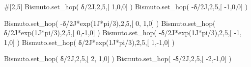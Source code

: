 \documentclass[
  letterpaper,
  DIV=11,
  numbers=noendperiod]{scrreprt}
\newenvironment{Shaded}{\begin{snugshade}}{\end{snugshade}}
\newcommand{\CommentTok}[1]{\textcolor[rgb]{0.37,0.37,0.37}{#1}}
\newcommand{\DecValTok}[1]{\textcolor[rgb]{0.68,0.00,0.00}{#1}}
\newcommand{\NormalTok}[1]{\textcolor[rgb]{0.00,0.23,0.31}{#1}}
\newcommand{\OperatorTok}[1]{\textcolor[rgb]{0.37,0.37,0.37}{#1}}
\newcommand{\OtherTok}[1]{\textcolor[rgb]{0.00,0.23,0.31}{#1}}
\begin{document}
\begin{Shaded}
\begin{Highlighting}[]
\CommentTok{\#[2,5]}
\NormalTok{Bismuto.set\_hop(   δ}\OperatorTok{/}\OtherTok{2J}\NormalTok{,}\DecValTok{2}\NormalTok{,}\DecValTok{5}\NormalTok{,[  }\DecValTok{1}\NormalTok{,}\DecValTok{0}\NormalTok{,}\DecValTok{0}\NormalTok{] ) }
\NormalTok{Bismuto.set\_hop(  }\OperatorTok{{-}}\NormalTok{δ}\OperatorTok{/}\OtherTok{2J}\NormalTok{,}\DecValTok{2}\NormalTok{,}\DecValTok{5}\NormalTok{,[ }\OperatorTok{{-}}\DecValTok{1}\NormalTok{,}\DecValTok{0}\NormalTok{,}\DecValTok{0}\NormalTok{] ) }

\NormalTok{Bismuto.set\_hop(  }\OperatorTok{{-}}\NormalTok{δ}\OperatorTok{/}\OtherTok{2J}\OperatorTok{*}\NormalTok{exp(}\OtherTok{1J}\OperatorTok{*}\NormalTok{pi}\OperatorTok{/}\DecValTok{3}\NormalTok{),}\DecValTok{2}\NormalTok{,}\DecValTok{5}\NormalTok{,[  }\DecValTok{0}\NormalTok{, }\DecValTok{1}\NormalTok{,}\DecValTok{0}\NormalTok{] ) }
\NormalTok{Bismuto.set\_hop(   δ}\OperatorTok{/}\OtherTok{2J}\OperatorTok{*}\NormalTok{exp(}\OtherTok{1J}\OperatorTok{*}\NormalTok{pi}\OperatorTok{/}\DecValTok{3}\NormalTok{),}\DecValTok{2}\NormalTok{,}\DecValTok{5}\NormalTok{,[  }\DecValTok{0}\NormalTok{,}\OperatorTok{{-}}\DecValTok{1}\NormalTok{,}\DecValTok{0}\NormalTok{] )}
\NormalTok{Bismuto.set\_hop(  }\OperatorTok{{-}}\NormalTok{δ}\OperatorTok{/}\OtherTok{2J}\OperatorTok{*}\NormalTok{exp(}\OtherTok{1J}\OperatorTok{*}\NormalTok{pi}\OperatorTok{/}\DecValTok{3}\NormalTok{),}\DecValTok{2}\NormalTok{,}\DecValTok{5}\NormalTok{,[ }\OperatorTok{{-}}\DecValTok{1}\NormalTok{, }\DecValTok{1}\NormalTok{,}\DecValTok{0}\NormalTok{] )}
\NormalTok{Bismuto.set\_hop(   δ}\OperatorTok{/}\OtherTok{2J}\OperatorTok{*}\NormalTok{exp(}\OtherTok{1J}\OperatorTok{*}\NormalTok{pi}\OperatorTok{/}\DecValTok{3}\NormalTok{),}\DecValTok{2}\NormalTok{,}\DecValTok{5}\NormalTok{,[  }\DecValTok{1}\NormalTok{,}\OperatorTok{{-}}\DecValTok{1}\NormalTok{,}\DecValTok{0}\NormalTok{] )}

\NormalTok{Bismuto.set\_hop(   δ}\OperatorTok{/}\OtherTok{2J}\NormalTok{,}\DecValTok{2}\NormalTok{,}\DecValTok{5}\NormalTok{,[  }\DecValTok{2}\NormalTok{, }\DecValTok{1}\NormalTok{,}\DecValTok{0}\NormalTok{] ) }
\NormalTok{Bismuto.set\_hop(  }\OperatorTok{{-}}\NormalTok{δ}\OperatorTok{/}\OtherTok{2J}\NormalTok{,}\DecValTok{2}\NormalTok{,}\DecValTok{5}\NormalTok{,[ }\OperatorTok{{-}}\DecValTok{2}\NormalTok{,}\OperatorTok{{-}}\DecValTok{1}\NormalTok{,}\DecValTok{0}\NormalTok{] ) }


\end{Highlighting}
\end{Shaded}
\end{document}
